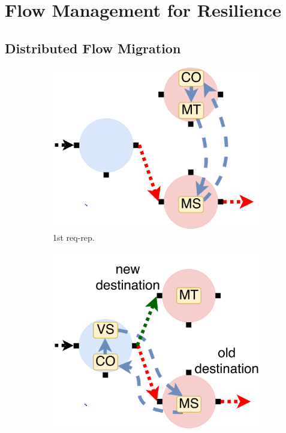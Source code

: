 \section{Flow Management for Resilience}

\subsection{Distributed Flow Migration}

\begin{figure}[!h]
\begin{subfigure}[t]{0.33\linewidth}
   \centering
   \includegraphics[width=\columnwidth]{figure/nfactor-mig1.pdf}
   \caption{1st req-rep.}\label{fig:mig1}
  \end{subfigure}\hfill
  \begin{subfigure}[t]{0.33\linewidth}
     \centering
     \includegraphics[width=\columnwidth]{figure/nfactor-mig2.pdf}

\end{subfigure}
\end{figure}
